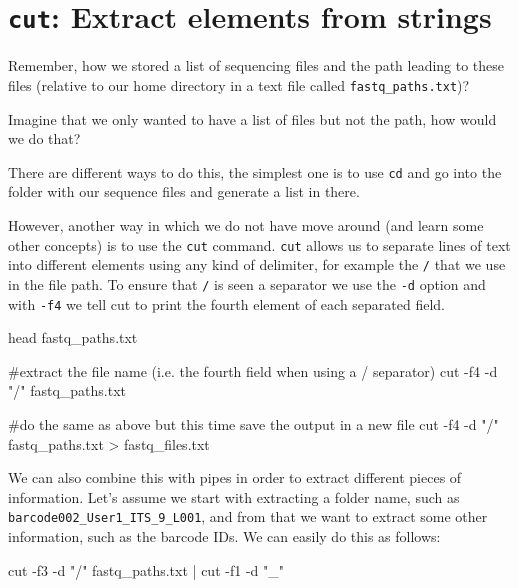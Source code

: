 \documentclass[
  letterpaper,
  DIV=11,
  numbers=noendperiod]{scrreprt}
\newenvironment{Shaded}{}{}
\newcommand{\AttributeTok}[1]{\textcolor[rgb]{0.84,0.23,0.29}{#1}}
\newcommand{\CommentTok}[1]{\textcolor[rgb]{0.42,0.45,0.49}{#1}}
\newcommand{\FunctionTok}[1]{\textcolor[rgb]{0.44,0.26,0.76}{#1}}
\newcommand{\KeywordTok}[1]{\textcolor[rgb]{0.84,0.23,0.29}{#1}}
\newcommand{\NormalTok}[1]{\textcolor[rgb]{0.14,0.16,0.18}{#1}}
\newcommand{\OperatorTok}[1]{\textcolor[rgb]{0.14,0.16,0.18}{#1}}
\newcommand{\StringTok}[1]{\textcolor[rgb]{0.01,0.18,0.38}{#1}}
\begin{document}
\section{\texorpdfstring{\texttt{cut}: Extract elements from
strings}{cut: Extract elements from strings}}\label{cut-extract-elements-from-strings}

Remember, how we stored a list of sequencing files and the path leading
to these files (relative to our home directory in a text file called
\texttt{fastq\_paths.txt})?

Imagine that we only wanted to have a list of files but not the path,
how would we do that?

There are different ways to do this, the simplest one is to use
\texttt{cd} and go into the folder with our sequence files and generate
a list in there.

However, another way in which we do not have move around (and learn some
other concepts) is to use the \texttt{cut} command. \texttt{cut} allows
us to separate lines of text into different elements using any kind of
delimiter, for example the \texttt{/} that we use in the file path. To
ensure that \texttt{/} is seen a separator we use the \texttt{-d} option
and with \texttt{-f4} we tell cut to print the fourth element of each
separated field.

\begin{Shaded}
\begin{Highlighting}[]
\FunctionTok{head}\NormalTok{ fastq\_paths.txt}

\CommentTok{\#extract the file name (i.e. the fourth field when using a / separator)}
\FunctionTok{cut} \AttributeTok{{-}f4} \AttributeTok{{-}d} \StringTok{"/"}\NormalTok{ fastq\_paths.txt}

\CommentTok{\#do the same as above but this time save the output in a new file}
\FunctionTok{cut} \AttributeTok{{-}f4} \AttributeTok{{-}d} \StringTok{"/"}\NormalTok{ fastq\_paths.txt }\OperatorTok{\textgreater{}}\NormalTok{ fastq\_files.txt}
\end{Highlighting}
\end{Shaded}

We can also combine this with pipes in order to extract different pieces
of information. Let's assume we start with extracting a folder name,
such as \texttt{barcode002\_User1\_ITS\_9\_L001}, and from that we want
to extract some other information, such as the barcode IDs. We can
easily do this as follows:

\begin{Shaded}
\begin{Highlighting}[]
\FunctionTok{cut} \AttributeTok{{-}f3} \AttributeTok{{-}d} \StringTok{"/"}\NormalTok{ fastq\_paths.txt }\KeywordTok{|} \FunctionTok{cut} \AttributeTok{{-}f1} \AttributeTok{{-}d} \StringTok{"\_"}
\end{Highlighting}
\end{Shaded}
\end{document}
